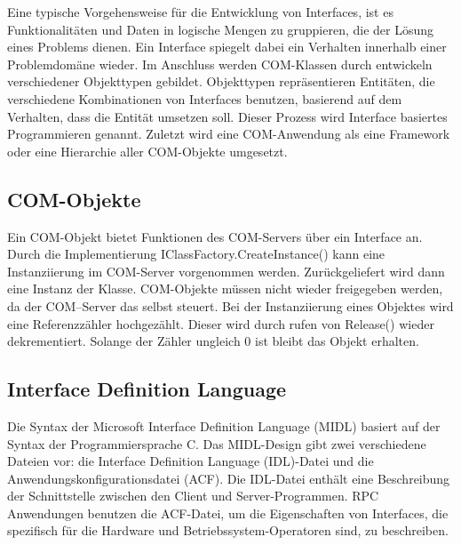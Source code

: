 Eine typische Vorgehensweise für die Entwicklung von Interfaces, ist es Funktionalitäten und Daten in logische Mengen zu gruppieren, die der Lösung eines Problems dienen. Ein Interface spiegelt dabei ein Verhalten innerhalb einer Problemdomäne wieder. Im Anschluss werden COM-Klassen durch entwickeln verschiedener Objekttypen gebildet. Objekttypen repräsentieren Entitäten, die verschiedene Kombinationen von Interfaces benutzen, basierend auf dem Verhalten, dass die Entität umsetzen soll. Dieser Prozess wird Interface basiertes Programmieren genannt. Zuletzt wird eine COM-Anwendung als eine Framework oder eine Hierarchie aller COM-Objekte umgesetzt.

\subsection{COM-Objekte}
\label{ch:grundlagen:sec:ComponentObjectModel:subsec:COMObjekte}

Ein COM-Objekt bietet Funktionen des COM-Servers über ein Interface an. Durch die Implementierung IClassFactory.CreateInstance() kann eine Instanziierung im COM-Server vorgenommen werden. Zurückgeliefert wird dann eine Instanz der Klasse. COM-Objekte müssen nicht wieder freigegeben werden, da der COM–Server das selbst steuert. Bei der Instanziierung eines Objektes  wird eine Referenzzähler hochgezählt. Dieser wird durch rufen von Release() wieder dekrementiert. Solange der Zähler ungleich 0 ist bleibt das Objekt erhalten. 

\subsection{Interface Definition Language}
\label{ch:grundlagen:sec:ComponentObjectModel:subsec:InterfaceDefinitionLanguage}

Die Syntax der Microsoft Interface Definition Language (MIDL) basiert auf der Syntax der Programmiersprache C. Das MIDL-Design gibt zwei verschiedene Dateien vor: die Interface Definition Language (IDL)-Datei und die Anwendungskonfigurationsdatei (ACF). Die IDL-Datei enthält eine Beschreibung der Schnittstelle zwischen den Client und Server-Programmen. RPC Anwendungen benutzen die ACF-Datei, um die Eigenschaften von Interfaces, die spezifisch für die Hardware und Betriebssystem-Operatoren sind, zu beschreiben.